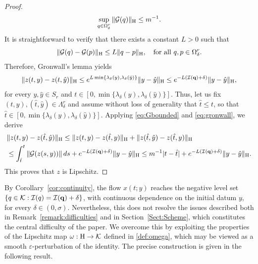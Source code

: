 \documentclass{article}
\newcommand{\boK}{\mathcal{K}}
\newcommand{\boI}{\mathcal{I}}
\newcommand{\boG}{\mathcal{G}}
\newcommand{\Hilb}{{\textnormal H}}
\newcommand{\minq}{{\bf q}}
\theoremstyle{definition}
\begin{document}
\begin{proof}
\begin{equation}\label{eq:F-estimate}
\sup_{q\in\Omega^r_\delta}\|{\boG}(q)\|_\Hilb\leq m^{-1}.
\end{equation}
It is straightforward to verify that there exists a constant $L>0$ such that
\begin{equation}\label{eq:Gbounded}
\|\boG(q)-\boG(p)\|_\Hilb\leq L\|q-p\|_\Hilb,\quad\text{for all }q,p\in\Omega_\delta^r.
\end{equation}
Therefore, Gronwall's lemma yields
\begin{equation}\label{eq:gronwall}
    \|z(t,y)-z(t,\hat y)\|_\Hilb\leq e^{L\min\{\lambda_\delta(y),\lambda_\delta(\hat y)\}}\|y-\hat y\|_\Hilb \leq e^{-L(\boI(\minq)+\delta)}\|y-\hat y\|_\Hilb,
\end{equation}
for every $y,\hat y\in S_r$ and $t\in [0,\min\{\lambda_\delta(y),\lambda_\delta(\hat y)\}]$. Thus, let us fix $(t,y),(\hat t,\hat y)\in \Lambda_\delta^r$ and assume without loss of generality that $\hat t\leq t$, so that $\hat t\in [0,\min\{\lambda_\delta(y),\lambda_\delta(\hat y)\}]$. Applying \eqref{eq:Gbounded} and \eqref{eq:gronwall}, we derive
\begin{align*}
    &\|z(t,y)-z(\hat t,\hat y)\|_\Hilb \leq \|z(t,y)-z(\hat t,y)\|_\Hilb + \|z(\hat t,\hat y)-z(\hat t,y)\|_\Hilb
    \\
    &\leq\int_{\hat t}^t\left\|\boG(z(s,y))\right\|ds + e^{-L(\boI(\minq)+\delta)}\|y-\hat y\|_\Hilb \leq m^{-1}|t- \hat t|+e^{-L(\boI(\minq)+\delta)}\|y-\hat y\|_\Hilb.
\end{align*}
This proves that $z$ is Lipschitz.
\end{proof}


    By Corollary~\ref{cor:continuity}, the flow $x(t;y)$ reaches the negative level set $\{q\in\boK:\boI(q)=\boI(\minq)+\delta\}$, with continuous dependence on the initial datum $y$, for every $\delta\in(0,\sigma)$. Nevertheless, this does not resolve the issues described both in Remark~\ref{remark:difficulties} and in Section~\ref{Sect:Scheme}, which constitutes the central difficulty of the paper. We overcome this by exploiting the properties of the Lipschitz map $\omega:\Hilb\to\boK$ defined in \eqref{def:omega}, which may be viewed as a smooth $\varepsilon$-perturbation of the identity. The precise construction is given in the following result.
\end{document}

